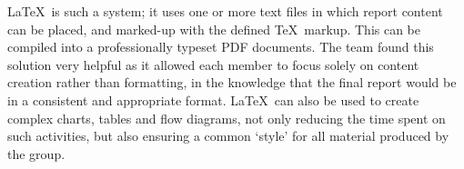 \LaTeX \  is such a system; it uses one or more text files in which report content can be placed, and marked-up with the defined \TeX \  markup. This can be compiled into a professionally typeset PDF documents. The team found this solution very helpful as it allowed each member to focus solely on content creation rather than formatting, in the knowledge that the final report would be in a consistent and appropriate format. \LaTeX \   can also be used to create complex charts, tables and flow diagrams, not only reducing the time spent on such activities, but also ensuring a common `style' for all material produced by the group.
